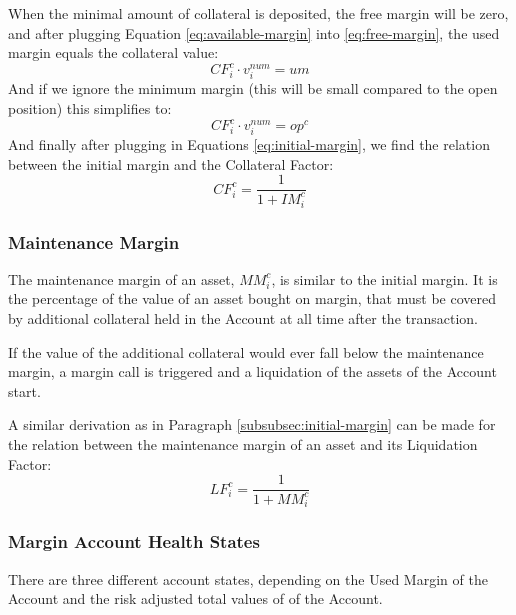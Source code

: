\documentclass[sigconf,nonacm]{acmart}
\begin{document}
When the minimal amount of collateral is deposited, the free margin will be zero, and after plugging Equation \ref{eq:available-margin} into \ref{eq:free-margin}, the used margin equals the collateral value:
\begin{equation}
    CF_{i}^{c} \cdot v^{num}_i = um
\end{equation}
And if we ignore the minimum margin (this will be small compared to the open position) this simplifies to:
\begin{equation}
    CF_{i}^{c} \cdot v^{num}_i = op^c
\end{equation}
And finally after plugging in Equations \ref{eq:initial-margin}, we find the relation between the initial margin and the Collateral Factor:
\begin{equation}
    CF_{i}^{c} = \frac{1}{1 + IM_{i}^{c}}
\end{equation}

\subsubsection{Maintenance Margin}
The maintenance margin of an asset, $MM_{i}^{c}$, is similar to the initial margin.
It is the percentage of the value of an asset bought on margin, that must be covered by additional collateral held in the Account at all time after the transaction.

If the value of the additional collateral would ever fall below the maintenance margin, a margin call is triggered and a liquidation of the assets of the Account start.

A similar derivation as in Paragraph \ref{subsubsec:initial-margin} can be made for the relation between the maintenance margin of an asset and its Liquidation Factor:
\begin{equation}
    LF_{i}^{c} = \frac{1}{1 + MM_{i}^{c}}
\end{equation}

\subsubsection{Margin Account Health States}
\label{subsubsec:margin-account-health-states}
There are three different account states, depending on the Used Margin of the Account and the risk adjusted total values of of the Account.

\end{document}
